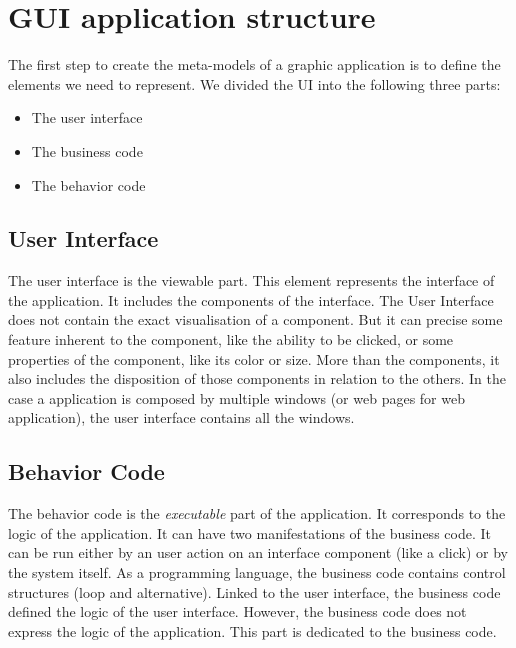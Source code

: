 \documentclass[conference]{IEEEtran}
\begin{document}
\section{GUI application structure}
\label{sec:guiAppDiv}

The first step to create the meta-models of a graphic application
    is to define the elements we need to represent.
We divided the UI into the following three parts:

\begin{itemize}
    \item The user interface
    \item The business code
    \item The behavior code 
\end{itemize}

\subsection{User Interface}
\label{sec:userInterface}

The user interface is the viewable part.
This element represents the interface of the application.
It includes the components of the interface.
The User Interface does not contain the exact visualisation of a component.
But it can precise some feature inherent to the component, like the ability to be clicked,
    or some properties of the component, like its color or size.
More than the components, it also includes the disposition
    of those components in relation to the others.
In the case a application is composed by multiple windows (or web pages for web application),
    the user interface contains all the windows.

\subsection{Behavior Code}
\label{sec:behaviorCode}

The behavior code is the \textit{executable} part of the application.
It corresponds to the logic of the application.
It can have two manifestations of the business code.
It can be run either by an user action on an interface component (like a click)
    or by the system itself.
As a programming language, the business code contains control structures
    (\ie loop and alternative).
Linked to the user interface, the business code defined the logic of the user interface.
However, the business code does not express the logic of the application.
This part is dedicated to the business code. 
\end{document}
